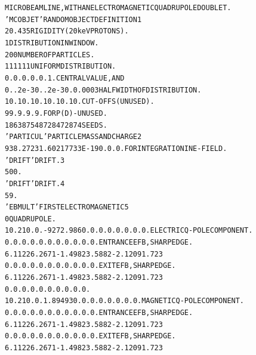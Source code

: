 \begin{tiny}
\begin{center}
\begin{alltt}

  MICROBEAM LINE, WITH AN ELECTROMAGNETIC QUADRUPOLE DOUBLET.                    
  'MCOBJET'                                     RANDOM  OBJECT  DEFINITION   1      
  20.435                                          RIGIDITY (20keV  PROTONS).     
  1                                               DISTRIBUTION IN WINDOW.        
  200                                             NUMBER  OF  PARTICLES.         
  1    1     1    1     1    1                    UNIFORM DISTRIBUTION.          
  0.   0.    0.   0.    0.   1.                   CENTRAL  VALUE,  AND           
  0.  .2e-3  0.  .2e-3  0.   0.0003               HALF WIDTH OF DISTRIBUTION.    
  10.  10.   10.  10.   10.  10.                  CUT-OFFS (UNUSED).             
  9   9. 9. 9. 9.                                 FOR P(D) - UNUSED.             
  186387 548728 472874                            SEEDS.                         
   'PARTICUL'                                   PARTICLE MASS AND CHARGE   2      
    938.2723 1.60217733E-19 0. 0. 0.              FOR INTEGRATION IN E-FIELD.    
  'DRIFT'                                       DRIFT.                    3      
  500.                                                                           
  'DRIFT'                                       DRIFT.                    4      
  59.                                                                            
  'EBMULT'                                      FIRST ELECTROMAGNETIC     5      
   0                                                            QUADRUPOLE.      
  10.2  10. 0. -9272.986  0. 0. 0. 0. 0. 0. 0. 0.     ELECTRIC Q-POLE COMPONENT. 
   0.  0.  0.  0.  0.  0.  0.  0. 0. 0. 0.            ENTRANCE EFB, SHARP EDGE.  
  6  .1122 6.2671 -1.4982 3.5882 -2.1209 1.723                                   
   0.  0.  0.  0.  0.  0.  0.  0. 0. 0. 0.            EXIT EFB, SHARP EDGE.      
  6  .1122 6.2671 -1.4982 3.5882 -2.1209 1.723                                   
   0. 0. 0. 0. 0. 0. 0. 0. 0. 0.                                                 
  10.2  10. 0.  1.89493  0. 0. 0. 0.  0. 0. 0. 0.     MAGNETIC Q-POLE COMPONENT. 
   0.  0.  0.  0.  0.  0.  0.  0. 0. 0. 0.            ENTRANCE EFB, SHARP EDGE.  
  6  .1122 6.2671 -1.4982 3.5882 -2.1209 1.723                                   
   0.  0.  0.  0.  0.  0.  0.   0. 0. 0. 0.           EXIT EFB, SHARP EDGE.      
  6  .1122 6.2671 -1.4982 3.5882 -2.1209 1.723                                   

\end{alltt}
\end{center}
\end{tiny}
